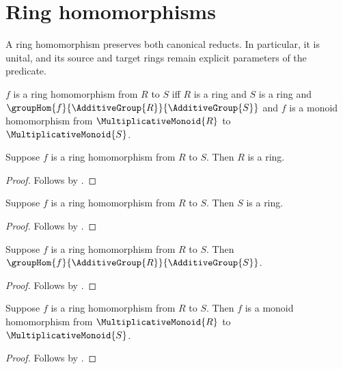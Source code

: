






\section{Ring homomorphisms}

A ring homomorphism preserves both canonical reducts.  In particular, it is
unital, and its source and target rings remain explicit parameters of the
predicate.

\begin{definition}\label{ring_hom}
    $f$ is a ring homomorphism from $R$ to $S$ iff
        $R$ is a ring and $S$ is a ring and
        $\groupHom{f}{\AdditiveGroup{R}}{\AdditiveGroup{S}}$ and
        $f$ is a monoid homomorphism from
            $\MultiplicativeMonoid{R}$ to $\MultiplicativeMonoid{S}$.
\end{definition}

\begin{proposition}\label{ring_hom_source_ring}
    Suppose $f$ is a ring homomorphism from $R$ to $S$.
    Then $R$ is a ring.
\end{proposition}
\begin{proof}
    Follows by .
\end{proof}

\begin{proposition}\label{ring_hom_target_ring}
    Suppose $f$ is a ring homomorphism from $R$ to $S$.
    Then $S$ is a ring.
\end{proposition}
\begin{proof}
    Follows by .
\end{proof}

\begin{proposition}\label{ring_hom_is_additive_group_hom}
    Suppose $f$ is a ring homomorphism from $R$ to $S$.
    Then $\groupHom{f}{\AdditiveGroup{R}}{\AdditiveGroup{S}}$.
\end{proposition}
\begin{proof}
    Follows by .
\end{proof}

\begin{proposition}\label{ring_hom_is_multiplicative_monoid_hom}
    Suppose $f$ is a ring homomorphism from $R$ to $S$.
    Then $f$ is a monoid homomorphism from
        $\MultiplicativeMonoid{R}$ to $\MultiplicativeMonoid{S}$.
\end{proposition}
\begin{proof}
    Follows by .
\end{proof}

